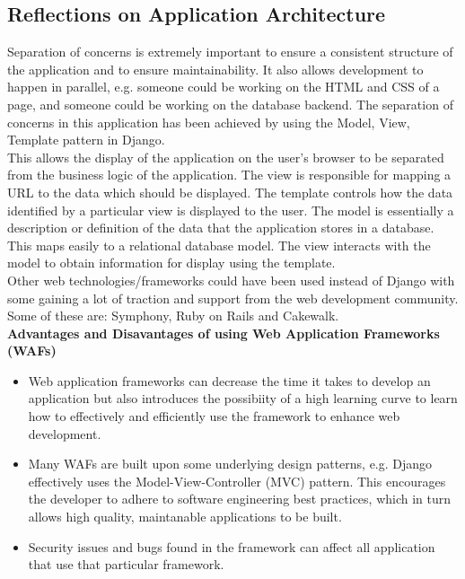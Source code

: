 \documentclass{sig-alt-release2}
\begin{document}
\subsection{Reflections on Application Architecture}
Separation of concerns is extremely important to ensure a consistent structure of the application and to ensure maintainability. It also allows development to happen in parallel, e.g. someone could be working on the HTML and CSS of a page, and someone could be working on the database backend. The separation of concerns in this application has been achieved by using the Model, View, Template pattern in Django. \\

This allows the display of the application on the user's browser to be separated from the business logic of the application. The view is responsible for mapping a URL to the data which should be displayed. The template controls how the data identified by a particular view is displayed to the user. The model is essentially a description or definition of the data that the application stores in a database. This maps easily to a relational database model. The view interacts with the model to obtain information for display using the template. \\

Other web technologies/frameworks could have been used instead of Django with some gaining a lot of traction and support from the web development community. Some of these are: Symphony, Ruby on Rails and Cakewalk. \\

\textbf{Advantages and Disavantages of using Web Application Frameworks (WAFs)}
\begin{itemize}
\item Web application frameworks can decrease the time it takes to develop an application but also introduces the possibiity of a high learning curve to learn how to effectively and efficiently use the framework to enhance web development.
\item Many WAFs are built upon some underlying design patterns, e.g. Django effectively uses the Model-View-Controller (MVC) pattern. This encourages the developer to adhere to software engineering best practices, which in turn allows high quality, maintanable applications to be built.
\item Security issues and bugs found in the framework can affect all application that use that particular framework.
\end{itemize}
\end{document}
